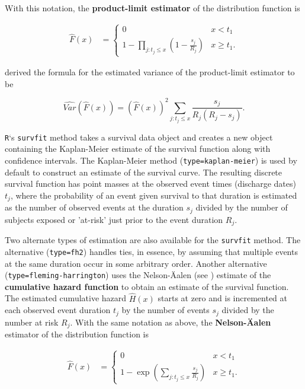 \documentclass[]{book}
\theoremstyle{definition}
\theoremstyle{definition}
\theoremstyle{definition}
\theoremstyle{remark}
\begin{document}
With this notation, the \textbf{product-limit estimator} of the
distribution function is

\[\begin{aligned}
\hat{F}(x) &=
\left\{
\begin{array}{ll}
0 & x<t_{1} \\
1-\prod_{j:t_{j} \leq x}\left( 1-\frac{s_j}{R_{j}}\right) & x \geq t_{1} .
\end{array}
\right.\end{aligned}\]

\citep{greenwood1926} derived the formula for the estimated variance of
the product-limit estimator to be

\[\widehat{Var}(\hat{F}(x)) = (\hat{F}(x))^{2} \sum _{j:t_{j} \leq x} \dfrac{s_j}{R_{j}(R_{j}-s_j)}.\]

\texttt{R}`s \texttt{survfit} method takes a survival data object and
creates a new object containing the Kaplan-Meier estimate of the
survival function along with confidence intervals. The Kaplan-Meier
method (\texttt{type=\textquotesingle{}kaplan-meier\textquotesingle{}})
is used by default to construct an estimate of the survival curve. The
resulting discrete survival function has point masses at the observed
event times (discharge dates) \(t_j\), where the probability of an event
given survival to that duration is estimated as the number of observed
events at the duration \(s_j\) divided by the number of subjects exposed
or 'at-risk' just prior to the event duration \(R_j\).

Two alternate types of estimation are also available for the
\texttt{survfit} method. The alternative
(\texttt{type=\textquotesingle{}fh2\textquotesingle{}}) handles ties, in
essence, by assuming that multiple events at the same duration occur in
some arbitrary order. Another alternative
(\texttt{type=\textquotesingle{}fleming-harrington\textquotesingle{}})
uses the Nelson-Äalen (see \citep{aalen1978}) estimate of the
\textbf{cumulative hazard function} to obtain an estimate of the
survival function. The estimated cumulative hazard \(\hat{H}(x)\) starts
at zero and is incremented at each observed event duration \(t_j\) by
the number of events \(s_j\) divided by the number at risk \(R_j\). With
the same notation as above, the \textbf{Nelson-Äalen} estimator of the
distribution function is

\[\begin{aligned}
\hat{F}(x) &=
\left\{
\begin{array}{ll}
0 & x<t_{1} \\
1- \exp \left(\sum_{j:t_{j} \leq x}\frac{s_j}{R_j} \right) & x \geq t_{1} .
\end{array}
\right.\end{aligned}\]
\end{document}
